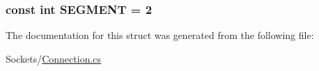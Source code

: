 \subsubsection[{S\+E\+G\+M\+E\+N\+T}]{\setlength{\rightskip}{0pt plus 5cm}const int S\+E\+G\+M\+E\+N\+T = 2}\label{structOTA_1_1Sockets_1_1Connection_1_1Message_a065b15c143ddeb22ce42ab60c7021bee}


The documentation for this struct was generated from the following file\+:\begin{DoxyCompactItemize}
\item 
Sockets/\hyperlink{Connection_8cs}{Connection.\+cs}\end{DoxyCompactItemize}
